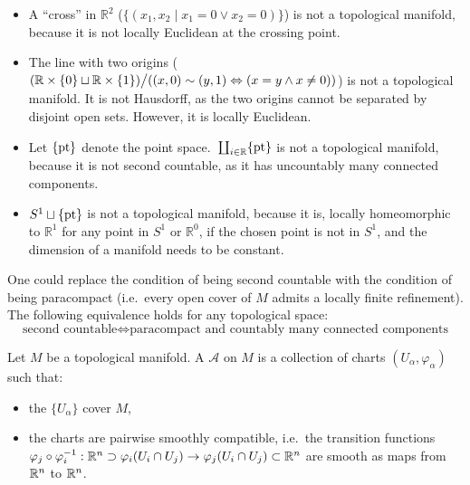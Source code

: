 \documentclass[a4paper,12pt]{article}
\begin{document}
\begin{nonexs}
    \begin{itemize}
        \item A \enquote{cross} in \(\mathbb{R}^2\) (\(\{(x_1,x_2\mid x_1=0 \lor x_2=0)\}\)) is not a topological manifold, because it is not locally Euclidean at the crossing point. 
        \item The line with two origins (\((\mathbb{R}\times\{0\}\sqcup\mathbb{R}\times\{1\})\big/((x,0)\sim(y,1)\Leftrightarrow (x=y \land x\neq 0))\)) is not a topological manifold. It is not Hausdorff, as the two origins cannot be separated by disjoint open sets. However, it is locally Euclidean.
        \item Let \(\{\mathrm{pt}\}\) denote the point space.\ \(\coprod_{i\in \mathbb{R}}\{\mathrm{pt}\}\) is not a topological manifold, because it is not second countable, as it has uncountably many connected components.
        \item \(S^1\sqcup\{\mathrm{pt}\}\) is not a topological manifold, because it is, locally homeomorphic to \(\mathbb{R}^1\) for any point in \(S^1\) or \(\mathbb{R}^0\), if the chosen point is not in \(S^1\), and the dimension of a manifold needs to be constant.
    \end{itemize}
\end{nonexs}

\begin{remark}
    One could replace the condition of being second countable with the condition of being paracompact (i.e.\ every open cover of \(M\) admits a locally finite refinement). The following equivalence holds for any topological space:
    \[\text{second countable}\iff \text{paracompact and countably many connected components}\]
\end{remark}




\begin{definition}
    Let \(M\) be a topological manifold. A  \(\mathcal{A}\) on \(M\) is a collection of charts \((U_\alpha,\varphi_\alpha)\) such that:
    \begin{itemize}
        \item the \(\{U_\alpha\}\) cover \(M\),
        \item the charts are pairwise smoothly compatible, i.e.\ the transition functions 
        \(\varphi_j \circ \varphi_i^{-1}:\mathbb{R}^n\supset\varphi_i(U_i\cap U_j)\to\varphi_j(U_i\cap U_j)\subset\mathbb{R}^n\) are smooth as maps from \(\mathbb{R}^n\) to \(\mathbb{R}^n\).
    \end{itemize}
\end{definition}
\end{document}
